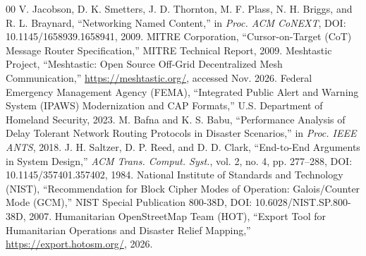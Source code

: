 \documentclass[conference,a4paper]{IEEEtran}
\begin{document}
\begin{thebibliography}{00}
 V. Jacobson, D. K. Smetters, J. D. Thornton, M. F. Plass, N. H. Briggs, and R. L. Braynard, ``Networking Named Content,'' in \textit{Proc. ACM CoNEXT}, DOI: 10.1145/1658939.1658941, 2009.
 MITRE Corporation, ``Cursor-on-Target (CoT) Message Router Specification,'' MITRE Technical Report, 2009.
 Meshtastic Project, ``Meshtastic: Open Source Off-Grid Decentralized Mesh Communication,'' \url{https://meshtastic.org/}, accessed Nov. 2026.
 Federal Emergency Management Agency (FEMA), ``Integrated Public Alert and Warning System (IPAWS) Modernization and CAP Formats,'' U.S. Department of Homeland Security, 2023.
 M. Bafna and K. S. Babu, ``Performance Analysis of Delay Tolerant Network Routing Protocols in Disaster Scenarios,'' in \textit{Proc. IEEE ANTS}, 2018.
 J. H. Saltzer, D. P. Reed, and D. D. Clark, ``End-to-End Arguments in System Design,'' \textit{ACM Trans. Comput. Syst.}, vol. 2, no. 4, pp. 277--288, DOI: 10.1145/357401.357402, 1984.
 National Institute of Standards and Technology (NIST), ``Recommendation for Block Cipher Modes of Operation: Galois/Counter Mode (GCM),'' NIST Special Publication 800-38D, DOI: 10.6028/NIST.SP.800-38D, 2007.
 Humanitarian OpenStreetMap Team (HOT), ``Export Tool for Humanitarian Operations and Disaster Relief Mapping,'' \url{https://export.hotosm.org/}, 2026.
\end{thebibliography}
\end{document}
